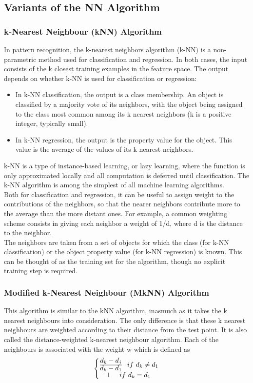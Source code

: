 \subsection{Variants of the NN Algorithm}
\subsubsection{k-Nearest Neighbour (kNN) Algorithm}
In pattern recognition, the k-nearest neighbors algorithm (k-NN) is a non-parametric method used for classification and regression.  In both cases, the input consists of the k closest training examples in the feature space. The output depends on whether k-NN is used for classification or regression:
\begin{itemize}
\item In k-NN classification, the output is a class membership. An object is classified by a majority vote of its neighbors, with the object being assigned to the class most common among its k nearest neighbors (k is a positive integer, typically small). 
\item In k-NN regression, the output is the property value for the object. This value is the average of the values of its k nearest neighbors.
\end{itemize}

k-NN is a type of instance-based learning, or lazy learning, where the function is only approximated locally and all computation is deferred until classification. The k-NN algorithm is among the simplest of all machine learning algorithms.\\ Both for classification and regression, it can be useful to assign weight to the contributions of the neighbors, so that the nearer neighbors contribute more to the average than the more distant ones. For example, a common weighting scheme consists in giving each neighbor a weight of 1/d, where d is the distance to the neighbor.\\ The neighbors are taken from a set of objects for which the class (for k-NN classification) or the object property value (for k-NN regression) is known. This can be thought of as the training set for the algorithm, though no explicit training step is required.

\subsubsection{Modified k-Nearest Neighbour (MkNN) Algorithm}
This algorithm is similar to the kNN algorithm, inasmuch as it takes the k nearest
neighbours into consideration. The only difference is that these k nearest neighbours
are weighted according to their distance from the test point. It is also called
the distance-weighted k-nearest neighbour algorithm. Each of the neighbours is
associated with the weight w which is defined as
$$ \left\{\begin{matrix}
\frac{ \mathlarger{d_{k} - d_{j}}} { \mathlarger{{d_{k} - d_{1}} }} \   \ if \ d_{k} \neq d_{1} \\ 
\mathlarger{1} \  \   \     \ if \ d_{k}  =  d_{1}
\end{matrix}\right.   $$

